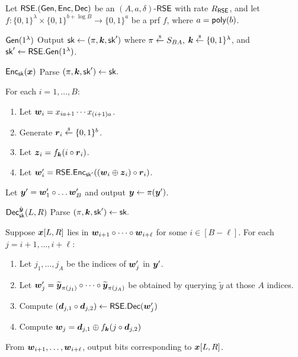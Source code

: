 \begin{construction}\label{constr:RSE_paLDC} 
Let $\mathsf{RSE}.(\mathsf{Gen},\mathsf{Enc},\mathsf{Dec})$ be an $(A,a,\delta)$-$\mathsf{RSE}$ with rate $R_{\mathsf{RSE}}$, and 
let $f : \{0,1\}^{\lambda} \times \{0,1\}^{b + \log B} \rightarrow \{0,1\}^{a}$ be a prf $f$, where $a = \mathsf{poly}(b)$.

\begin{weirdFrame}{$\mathsf{Gen}(1^\lambda) $}
    Output $\mathsf{sk} \leftarrow (\pi,\boldsymbol{k},\mathsf{sk}')$ where $\pi \overset{{\scriptscriptstyle\$}}{\leftarrow} S_{BA},$ $ \boldsymbol{k} \overset{{\scriptscriptstyle\$}}{\leftarrow} \{0,1\}^\lambda$, and $\mathsf{sk}' \leftarrow \mathsf{RSE}.\mathsf{Gen}(1^\lambda)$.
\end{weirdFrame}

\begin{weirdFrame}{$\mathsf{Enc}_{\mathsf{sk}}({\boldsymbol{x}})$}
Parse $(\pi,\boldsymbol{k},\mathsf{sk}') \leftarrow \mathsf{sk}.$

For each $i= 1,\dots,B:$
\begin{enumerate}
    \item Let $\boldsymbol{w}_i = x_{ia + 1} \cdots x_{(i + 1)a}$.
    \item Generate $\boldsymbol{r}_i \overset{{\scriptscriptstyle\$}}{\leftarrow} \{0,1\}^{b}$.
    \item Let $\boldsymbol{z}_i = f_{\boldsymbol{k}}(i \circ \boldsymbol{r}_i)$.
    \item Let $\boldsymbol{w}'_i = \mathsf{RSE}.\mathsf{Enc}_{\mathsf{sk}'}((\boldsymbol{w}_i \oplus \boldsymbol{z}_i) \circ \boldsymbol{r}_i)$.
\end{enumerate} 
Let $\boldsymbol{y}' = \boldsymbol{w}'_1 \circ \dots \boldsymbol{w}'_B$ and output $\boldsymbol{y} \leftarrow \pi(\boldsymbol{y}')$.

\end{weirdFrame}

\begin{weirdFrame}{$\mathsf{Dec}^{\Tilde{\boldsymbol{y}}}_{\mathsf{sk}}(L,R)$}
Parse $(\pi,\boldsymbol{k},\mathsf{sk}') \leftarrow \mathsf{sk}.$

Suppose ${\boldsymbol{x}}[L,R]$ lies in $\boldsymbol{w}_{i + 1} \circ \dots \circ \boldsymbol{w}_{i + \ell}$ for some $i \in [B - \ell]$.
For each $j = i + 1, \dots, i + \ell$:
\begin{enumerate}
    \item Let $j_1,\dots,j_A$ be the indices of $\boldsymbol{w}_j'$ in $\boldsymbol{y}'$.
    \item Let $\boldsymbol{w}'_j = \widetilde{\boldsymbol{y}}_{\pi(j_1)}\circ\dots\circ\widetilde{\boldsymbol{y}}_{\pi(j_A)}$ be obtained by querying $\widetilde y$ at those $A$ indices.
    \item Compute $(\boldsymbol{d}_{j,1} \circ \boldsymbol{d}_{j,2}) \leftarrow \mathsf{RSE}.\mathsf{Dec}(\boldsymbol{w}'_j)$ 
    \item Compute $\boldsymbol{w}_j = \boldsymbol{d}_{j,1} \oplus f_{\boldsymbol{k}}(j \circ \boldsymbol{d}_{j,2})$
\end{enumerate}
From $\boldsymbol{w}_{i + 1},\dots,\boldsymbol{w}_{i + \ell}$, output bits corresponding to ${\boldsymbol{x}}[L,R]$. 
\end{weirdFrame}
\end{construction}